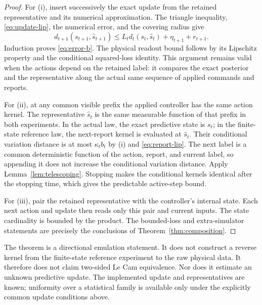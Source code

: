 \begin{proof}
For \textup{(i)}, insert successively the exact update from the retained
representative and its numerical approximation. The triangle inequality,
\eqref{eq:update-lip}, the numerical error, and the covering radius give
\[
 d_{t+1}(s_{t+1},\hat s_{t+1})
 \le L_td_t(s_t,\hat s_t)+\eta_{t+1}+r_{t+1}.
\]
Induction proves \eqref{eq:error-b}. The physical readout bound follows
by its Lipschitz property and the conditional squared-loss identity.
This argument remains valid when the actions depend on the retained label:
it compares the exact posterior and the representative along the actual
same sequence of applied commands and reports.

For \textup{(ii)}, at any common visible prefix the applied controller has
the same action kernel. The representative $\hat s_t$ is the same
measurable function of that prefix in both experiments. In the actual law,
the exact predictive state is $s_t$; in the finite-state reference law, the
next-report kernel is evaluated at $\hat s_t$. Their conditional
variation distance is at most $\kappa_tb_t$ by \textup{(i)} and
\eqref{eq:report-lip}. The next label is a common deterministic function
of the action, report, and current label, so appending it does not increase
the conditional variation distance. Apply Lemma~\ref{lem:telescoping}.
Stopping makes the conditional kernels identical after the stopping time,
which gives the predictable active-step bound.

For \textup{(iii)}, pair the retained representative with the controller's
internal state. Each next action and update then reads only this pair and
current inputs. The state cardinality is bounded by the product. The
bounded-loss and extra-simulator statements are precisely the conclusions
of Theorem~\ref{thm:composition}.
\end{proof}

The theorem is a directional emulation statement. It does not construct a
reverse kernel from the finite-state reference experiment to the raw
physical data. It therefore does not claim two-sided Le Cam equivalence.
Nor does it estimate an unknown predictive update. The implemented update
and representatives are known; uniformity over a statistical family is
available only under the explicitly common update conditions above.

